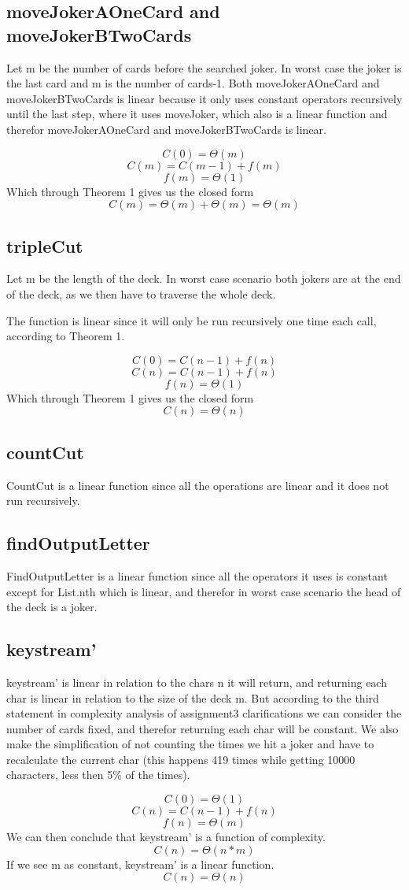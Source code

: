\documentclass[12pt, a4paper]{article}
\begin{document}
\subsection{moveJokerAOneCard and moveJokerBTwoCards}
Let m be the number of cards before the searched joker. In worst case the joker is the last card and m is the number of cards-1.
Both moveJokerAOneCard and moveJokerBTwoCards is linear because it only uses constant operators recursively until the last step, where it uses moveJoker, which also is a linear function and therefor moveJokerAOneCard and moveJokerBTwoCards is linear.

$$C(0) = \Theta(m)$$
$$C(m) = C(m-1) + f(m)$$
$$f(m) = \Theta(1)$$
Which through Theorem 1 gives us the closed form
$$C(m) = \Theta(m) + \Theta(m) = \Theta(m)$$

\subsection{tripleCut}
Let m be the length of the deck. In worst case scenario both jokers are at the end of the deck, as we then have to traverse the whole deck.

The function is linear since it will only be run recursively one time each call, according to Theorem 1.

$$C(0) = C(n-1) + f(n)$$
$$C(n) = C(n-1) + f(n)$$
$$f(n) = \Theta(1)$$
Which through Theorem 1 gives us the closed form
$$C(n) = \Theta(n)$$

\subsection{countCut}
CountCut is a linear function since all the operations are linear and it does not run recursively.

\subsection{findOutputLetter}
FindOutputLetter is a linear function since all the operators it uses is constant except for List.nth which is linear, and therefor in worst case scenario the head of the deck is a joker.

\subsection{keystream'}
keystream' is linear in relation to the chars n it will return, and returning each char is linear in relation to the size of the deck m. But according to the third statement in complexity analysis of assignment3 clarifications we can consider the number of cards fixed, and therefor returning each char will be constant. We also make the simplification of not counting the times we hit a joker and have to recalculate the current char (this happens 419 times while getting 10000 characters, less then 5\% of the times).

$$C(0) = \Theta(1)$$
$$C(n) = C(n-1) + f(n)$$
$$f(n) = \Theta(m)$$
We can then conclude that keystream' is a function of complexity.
$$C(n) = \Theta(n*m)$$
If we see m as constant, keystream' is a linear function.
$$C(n) = \Theta(n)$$
\end{document}

